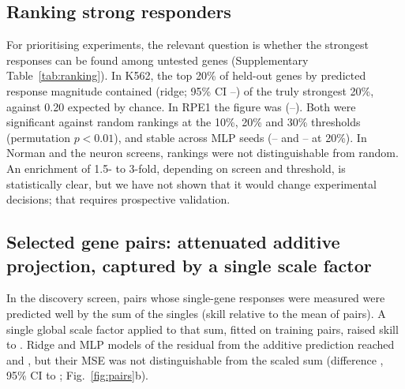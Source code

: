 \subsection{Ranking strong responders}
For prioritising experiments, the relevant question is whether the strongest responses can be found among untested genes (Supplementary Table~\ref{tab:ranking}). In K562, the top 20\% of held-out genes by predicted response magnitude contained \numRkReplogleKEssentialRidgeTwenty{} (ridge; 95\% CI \numRkLoReplogleKEssentialRidgeTwenty--\numRkHiReplogleKEssentialRidgeTwenty) of the truly strongest 20\%, against 0.20 expected by chance. In RPE1 the figure was \numRkReplogleRpeRidgeTwenty{} (\numRkLoReplogleRpeRidgeTwenty--\numRkHiReplogleRpeRidgeTwenty). Both were significant against random rankings at the 10\%, 20\% and 30\% thresholds (permutation $p<0.01$), and stable across MLP seeds (\numRkSeedMinReplogleKEssential--\numRkSeedMaxReplogleKEssential{} and \numRkSeedMinReplogleRpe--\numRkSeedMaxReplogleRpe{} at 20\%). In Norman and the neuron screens, rankings were not distinguishable from random. An enrichment of 1.5- to 3-fold, depending on screen and threshold, is statistically clear, but we have not shown that it would change experimental decisions; that requires prospective validation.

\subsection{Selected gene pairs: attenuated additive projection, captured by a single scale factor}
In the discovery screen, pairs whose single-gene responses were measured were predicted well by the sum of the singles (skill \numPairskillAdditive{} relative to the mean of pairs). A single global scale factor applied to that sum, fitted on training pairs, raised skill to \numPairskillScaledAdditive. Ridge and MLP models of the residual from the additive prediction reached \numPairskillRidgeOnAdditive{} and \numPairskillMlpOnAdditive, but their MSE was not distinguishable from the scaled sum (difference \numPairMseDiffScaled, 95\% CI \numPairMseDiffScaledLo{} to \numPairMseDiffScaledHi; Fig.~\ref{fig:pairs}b).

